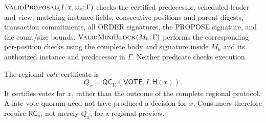\documentclass[11pt,a4paper,onecolumn]{article}
\newcommand{\Hash}{\mathsf H}
\newcommand{\QC}{\mathsf{QC}}
\newcommand{\RC}{\mathsf{RC}}
\newcommand{\Tag}[1]{\mathsf{#1}}
\newcommand{\Proc}[1]{\textnormal{\textsc{#1}}}
\theoremstyle{remark}\newtheorem{example}[definition]{Example}
\newcounter{protocol}
\begin{document}
$\Proc{ValidProposal}(I,x,\omega_x;\Gamma)$ checks the certified predecessor,
scheduled leader and view, matching instance fields, consecutive positions
and parent digests, transaction commitments, all ORDER signatures, the
PROPOSE signature, and the count/size bounds.
$\Proc{ValidMiniBlock}(M_h;\Gamma)$ performs the corresponding per-position
checks using the complete body and signature inside $M_h$ and its authorized
instance and predecessor in $\Gamma$. Neither predicate checks execution.

The regional \emph{vote} certificate is
\[
 Q_x=\QC_{V_i}(\Tag{VOTE},I,\Hash(x)).
\]
It certifies votes for $x$, rather than the outcome of the complete regional
protocol. A late vote quorum need not have produced a decision for $x$.
Consumers therefore require $\RC_u$, not merely $Q_x$, for a regional preview.
\end{document}
